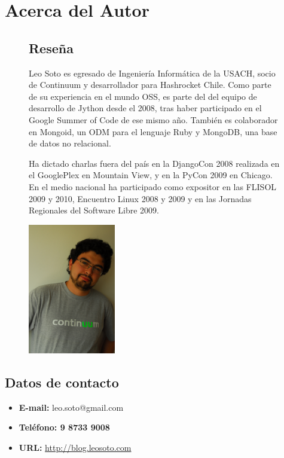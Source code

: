 \section{Acerca del Autor}

\begin{figure}[h]
\begin{minipage}{11.5cm}

\subsection{Reseña}

Leo Soto es egresado de Ingeniería Informática de la USACH, socio de Continuum y
desarrollador para Hashrocket Chile. Como parte de su experiencia en el mundo
OSS, es parte del del equipo de desarrollo de Jython desde el 2008, tras haber
participado en el Google Summer of Code de ese mismo año. También es colaborador
en Mongoid, un ODM para el lenguaje Ruby y MongoDB, una base de datos no
relacional.

Ha dictado charlas fuera del país en la DjangoCon 2008 realizada en el
GooglePlex en Mountain View, y en la PyCon 2009 en Chicago. En el medio nacional
ha participado como expositor en las FLISOL 2009 y 2010, Encuentro Linux 2008 y
2009 y en las Jornadas Regionales del Software Libre 2009.

\end{minipage}
\begin{minipage}{1.7in}
\includegraphics[width=1.5in]{images/DSC_0450.JPG}
\end{minipage}
\end{figure}

\subsection{Datos de contacto}

\begin{itemize}
\item{\textbf{E-mail:} leo.soto@gmail.com}
\item\textbf{{Teléfono:} 9 8733 9008}
\item{\textbf{URL:} \url{http://blog.leosoto.com}}
\end{itemize}
